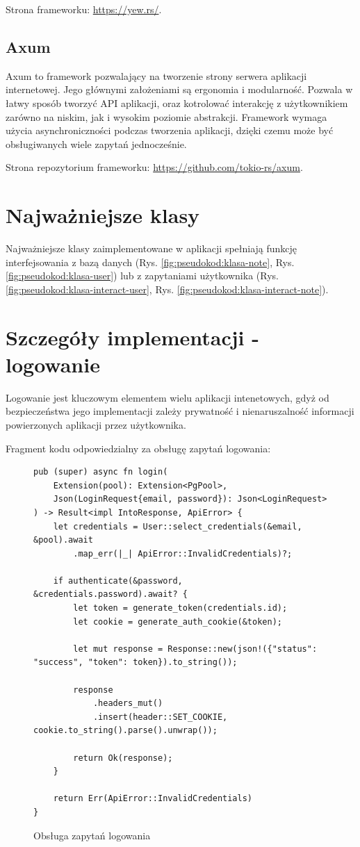 \documentclass[a4paper,twoside,12pt]{book}
\begin{document}
Strona frameworku: \url{https://yew.rs/}.

\subsection{Axum}

Axum to framework pozwalający na tworzenie strony serwera aplikacji internetowej.
Jego głównymi założeniami są ergonomia i modularność. Pozwala w łatwy sposób 
tworzyć API aplikacji, oraz kotrolować interakcję z użytkownikiem zarówno na niskim,
jak i wysokim poziomie abstrakcji. Framework wymaga użycia asynchroniczności podczas
tworzenia aplikacji, dzięki czemu może być obsługiwanych wiele zapytań jednocześnie.

Strona repozytorium frameworku: \url{https://github.com/tokio-rs/axum}.

\section{Najważniejsze klasy}

Najważniejsze klasy zaimplementowane w aplikacji spełniają funkcję interfejsowania
z bazą danych (Rys. \ref{fig:pseudokod:klasa-note}, Rys. \ref{fig:pseudokod:klasa-user}) lub z zapytaniami użytkownika (Rys. \ref{fig:pseudokod:klasa-interact-user}, Rys. \ref{fig:pseudokod:klasa-interact-note}).


\section{Szczegóły implementacji - logowanie}

Logowanie jest kluczowym elementem wielu aplikacji intenetowych,
gdyż od bezpieczeństwa jego implementacji zależy prywatność i nienaruszalność
informacji powierzonych aplikacji przez użytkownika.

Fragment kodu odpowiedzialny za obsługę zapytań logowania:

\begin{figure}[H]
\centering
\begin{lstlisting}
pub (super) async fn login(
    Extension(pool): Extension<PgPool>,
    Json(LoginRequest{email, password}): Json<LoginRequest>
) -> Result<impl IntoResponse, ApiError> {
    let credentials = User::select_credentials(&email, &pool).await
        .map_err(|_| ApiError::InvalidCredentials)?;
    
    if authenticate(&password, &credentials.password).await? {
        let token = generate_token(credentials.id);
        let cookie = generate_auth_cookie(&token);

        let mut response = Response::new(json!({"status": "success", "token": token}).to_string());

        response
            .headers_mut()
            .insert(header::SET_COOKIE, cookie.to_string().parse().unwrap());

        return Ok(response);
    }

    return Err(ApiError::InvalidCredentials)
}
\end{lstlisting}
\caption{Obsługa zapytań logowania}
\label{fig:pseudokod:logowanie}
\end{figure}
\end{document}
